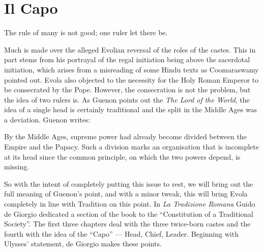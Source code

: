 \section{Il Capo}

\begin{quotex}
The rule of many is not good; one ruler let there be.
\end{quotex}


Much is made over the alleged Evolian reversal of the roles of the castes. This in part stems from his portrayal of the regal initiation being above the sacerdotal initiation, which arises from a misreading of some Hindu texts as Coomaraswamy pointed out. Evola also objected to the necessity for the Holy Roman Emperor to be consecrated by the Pope. However, the consecration is not the problem, but the idea of two rulers is. As Guenon points out the \emph{The Lord of the World}, the idea of a single head is certainly traditional and the split in the Middle Ages was a deviation. Guenon writes:

\begin{quotex}
By the Middle Ages, supreme power had already become divided between the Empire and the Papacy. Such a division marks an organisation that is incomplete at its head since the common principle, on which the two powers depend, is missing.
\end{quotex}


So with the intent of completely putting this issue to rest, we will bring out the full meaning of Guenon's point, and with a minor tweak, this will bring Evola completely in line with Tradition on this point. In \emph{La Tradizione Romana} Guido de Giorgio dedicated a section of the book to the ``Constitution of a Traditional Society''. The first three chapters deal with the three twice-born castes and the fourth with the idea of the ``Capo'' --- Head, Chief, Leader. Beginning with Ulysses' statement, de Giorgio makes these points.

